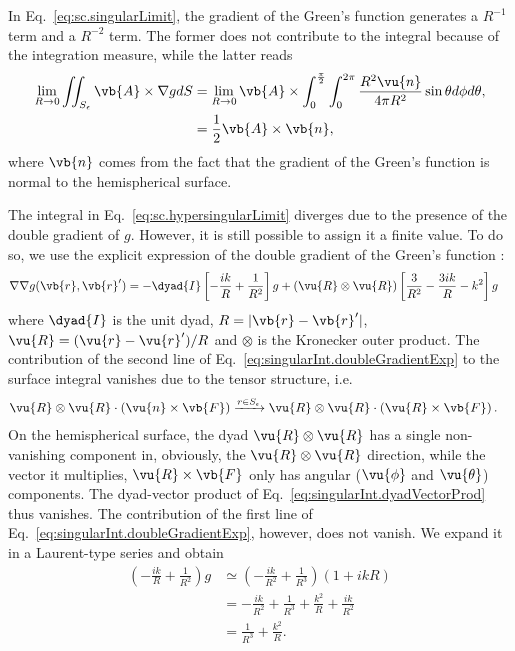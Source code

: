 \documentclass[11pt,SymmetricalJury]{inrsthesis/inrsthesis}
\begin{document}
In Eq.~\eqref{eq:sc.singularLimit}, the gradient of the Green's function
generates a $R^{-1}$ term and a $R^{-2}$ term. The former does not contribute to the integral
because of the integration measure, while the latter reads
  \begin{align}
    \lim_{R\rightarrow0}\iint_{S_\epsilon}\vb{A}\times\nabla gdS
      &= \lim_{R\rightarrow0}\vb{A}\times
      \int_0^{\frac{\pi}{2}}\int_0^{2\pi}\frac{R^2\vu{n}}{4\pi R^2}\sin\theta d\phi d\theta, \nonumber\\
      &= \frac{1}{2}\vb{A}\times\vb{n},
  \end{align}
where $\vb{n}$ comes from the fact that the gradient of the Green's function is
normal to the hemispherical surface.

The integral in Eq.~\eqref{eq:sc.hypersingularLimit} diverges due to the presence
of the double gradient of $g$. However, it is still possible to assign it a finite
value.
To do so, we use the explicit
expression of the double gradient of the Green's function \cite[Eq. (2.61)]{Volakis2012}:
  \begin{align}
    \label{eq:singularInt.doubleGradientExp}
    \nabla\nabla g(\vb{r},\vb{r}')  &= -\dyad{I}\left[-\frac{ik}{R}+\frac{1}{R^2}\right]g
                    +\left(\vu{R}\otimes\vu{R}\right)\left[\frac{3}{R^2}-\frac{3ik}{R}-k^2\right]g
  \end{align}
where $\dyad{I}$ is the unit dyad, $R=|\vb{r}-\vb{r}'|$, $\vu{R}=(\vu{r}-\vu{r}')/R$
and $\otimes$ is the Kronecker outer product. The contribution of the second line
of Eq.~\eqref{eq:singularInt.doubleGradientExp} to the surface integral
vanishes due to the tensor structure, i.e.
  \begin{align}
    \label{eq:singularInt.dyadVectorProd}
    \vu{R}\otimes\vu{R}\cdot\left(\vu{n}\times\vb{F}\right)&\xrightarrow{r\in S_\epsilon}
      \vu{R}\otimes\vu{R}\cdot\left(\vu{R}\times\vb{F}\right).
  \end{align}
On the hemispherical surface, the dyad $\vu{R}\otimes\vu{R}$ has a single
non-vanishing component in, obviously, the $\vu{R}\otimes\vu{R}$ direction, while the vector
it multiplies, $\vu{R}\times\vb{F}$ only has angular ($\vu{\phi}$ and $\vu{\theta}$)
components. The dyad-vector product
of Eq.~\eqref{eq:singularInt.dyadVectorProd} thus
vanishes. The contribution of the first line of Eq.~\eqref{eq:singularInt.doubleGradientExp}, however,
does not vanish. We expand it in a Laurent-type series and obtain
  \begin{align*}
    \left(-\frac{ik}{R}+\frac{1}{R^2}\right)g
      &\simeq \left(-\frac{ik}{R^2}+\frac{1}{R^3}\right)\left(1+ikR\right) \\
      &= -\frac{ik}{R^2}+\frac{1}{R^3}+\frac{k^2}{R}+\frac{ik}{R^2} \\
      &= \frac{1}{R^3}+\frac{k^2}{R}.
  \end{align*}
\end{document}
